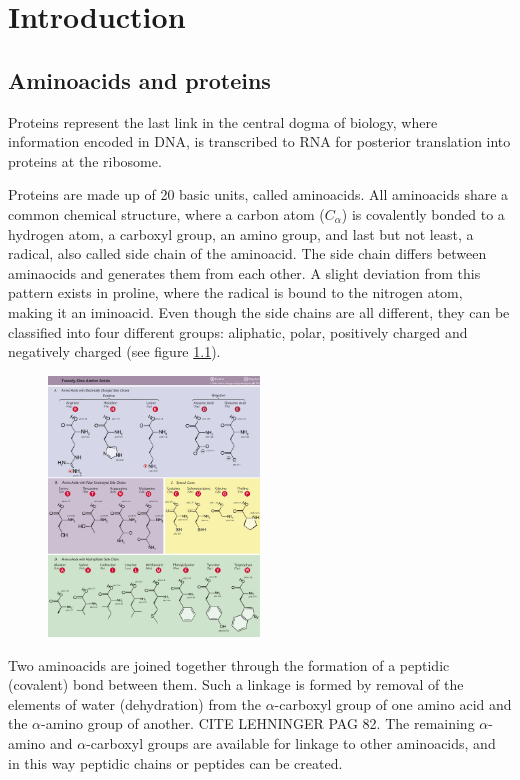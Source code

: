 \documentclass[11pt, a4paper]{report}
\begin{document}
\chapter{Introduction}
\label{chap:introduction}

\section{Aminoacids and proteins}

Proteins represent the last link in the central dogma of biology, where information encoded in DNA, is transcribed to RNA for posterior translation into proteins at the ribosome.

Proteins are made up of 20 basic units, called aminoacids. All aminoacids share a common chemical structure, where a carbon atom ($C_\alpha$) is covalently bonded to a hydrogen atom, a carboxyl group, an amino group, and last but not least, a radical, also called side chain of the aminoacid. The side chain differs between aminaocids and generates them from each other. A slight deviation from this pattern exists in proline, where the radical is bound to the nitrogen atom, making it an iminoacid. Even though the side chains are all different, they can be classified into four different groups: aliphatic, polar, positively charged and negatively charged (see figure \ref{fig:aminoacids}).

\begin{figure}
  \centering
  \includegraphics[width=0.5\textwidth]{aminoacids.png}
  \caption{}
  \label{fig:aminoacids}
\end{figure}

Two aminoacids are joined together through the formation of a peptidic (covalent) bond between them. Such a linkage is formed by removal of the elements of water (dehydration) from the $\alpha$-carboxyl group of one amino acid and the $\alpha$-amino group of another. CITE LEHNINGER PAG 82. The remaining $\alpha$-amino and $\alpha$-carboxyl groups are available for linkage to other aminoacids, and in this way peptidic chains or peptides can be created.
\end{document}
